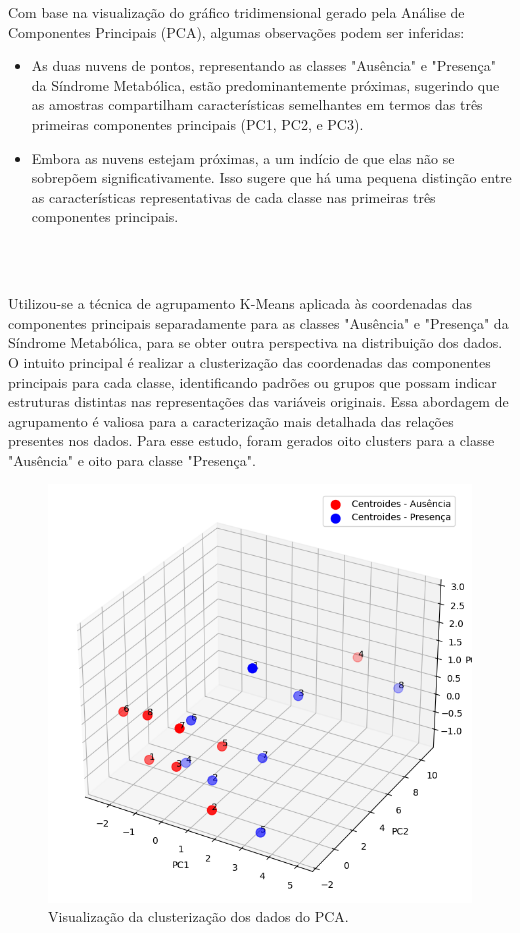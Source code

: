 \documentclass[12pt, a4paper]{article}
\begin{document}
Com base na visualização do gráfico tridimensional gerado pela Análise de Componentes Principais (PCA), algumas observações podem ser inferidas:
\begin{itemize}
\item As duas nuvens de pontos, representando as classes "Ausência" e "Presença" da Síndrome Metabólica, estão predominantemente próximas, sugerindo que as amostras compartilham características semelhantes em termos das três primeiras componentes principais (PC1, PC2, e PC3).
\item Embora as nuvens estejam próximas, a um indício de que elas não se sobrepõem significativamente. Isso sugere que há uma pequena distinção entre as características representativas de cada classe nas primeiras três componentes principais.
\end{itemize} \\
\\
\par Utilizou-se a técnica de agrupamento K-Means aplicada às coordenadas das componentes principais separadamente para as classes "Ausência" e "Presença" da Síndrome Metabólica, para se obter outra perspectiva na distribuição dos dados. O intuito principal é realizar a clusterização das coordenadas das componentes principais para cada classe, identificando padrões ou grupos que possam indicar estruturas distintas nas representações das variáveis originais. Essa abordagem de agrupamento é valiosa para a caracterização mais detalhada das relações presentes nos dados. Para esse estudo, foram gerados oito clusters para a classe "Ausência" e oito para classe "Presença".

\begin{figure}[htbp]
    \centering
    \includegraphics[scale=0.5]{img/k_mean.png}
    \caption{Visualização da clusterização dos dados do PCA.}
\end{figure}
\break
\end{document}
